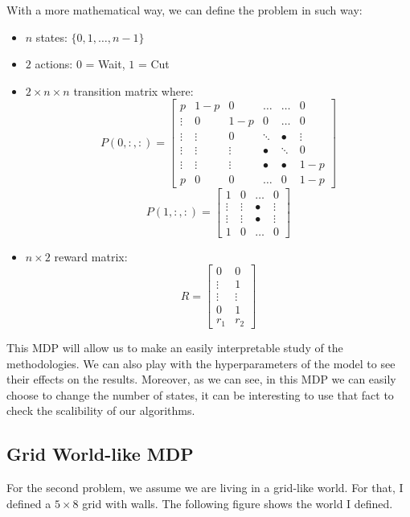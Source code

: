 \documentclass[11pt]{article}
\begin{document}
\begin{multicols}{2}
With a more mathematical way, we can define the problem in such way:
\begin{itemize}
\item $n$ states: $\lbrace 0, 1, \dots , n-1 \rbrace$
\item $2$ actions: $0$ = Wait, $1$ = Cut
\item $2\times n \times n$ transition matrix where: 
$$P(0,:,:) = \left[\begin{array}{cccccc}
p & 1-p & 0 & \dots & \dots & 0 \\ 
\vdots & 0 & 1-p & 0 & \dots & 0 \\ 
\vdots & \vdots & 0 & \ddots & • & \vdots \\ 
\vdots & \vdots & \vdots & • & \ddots & 0 \\ 
\vdots & \vdots & \vdots & • & • & 1-p \\ 
p & 0 & 0 & \dots & 0 & 1-p
\end{array}\right]  $$
$$P(1,:,:) = \left[ \begin{array}{cccc}
1 & 0 & \dots & 0 \\ 
\vdots & \vdots & • & \vdots \\ 
\vdots & \vdots & • & \vdots \\ 
1 & 0 & \dots & 0
\end{array}  \right] $$
\item $n\times 2$ reward matrix:
$$ R = \left[\begin{array}{cc}
0 & 0 \\ 
\vdots & 1 \\ 
\vdots & \vdots \\ 
0 & 1 \\ 
r_1 & r_2
\end{array} \right] $$
\end{itemize}

This MDP will allow us to make an easily interpretable study of the methodologies. We can also play with the hyperparameters of the model to see their effects on the results. Moreover, as we can see, in this MDP we can easily choose to change the number of states, it can be interesting to use that fact to check the scalibility of our algorithms.

\subsection{Grid World-like MDP}

For the second problem, we assume we are living in a grid-like world. For that, I defined a $5\times 8$ grid with walls. The following figure shows the world I defined.


\end{multicols}
\end{document}

